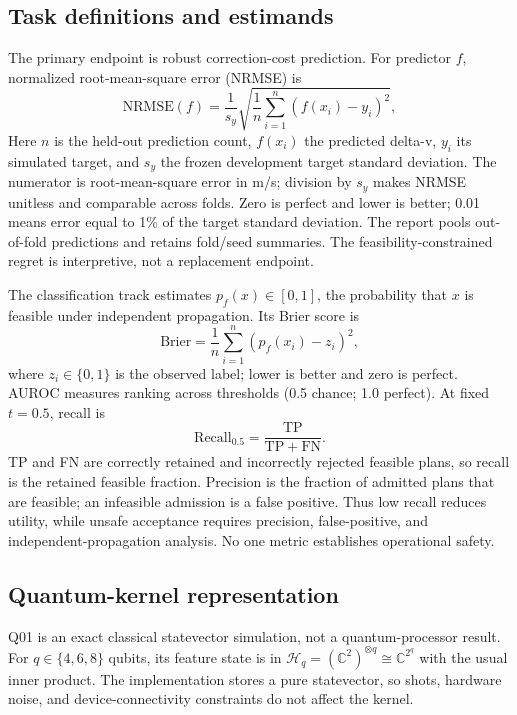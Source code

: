 \subsection{Task definitions and estimands}

The primary endpoint is robust correction-cost prediction. For predictor $f$,
normalized root-mean-square error (NRMSE) is
\begin{equation}
\mathrm{NRMSE}(f) =
\frac{1}{s_y}\sqrt{\frac{1}{n}\sum_{i=1}^{n}\left(f(x_i)-y_i\right)^2},
\label{eq:nrmse}
\end{equation}
Here $n$ is the held-out prediction count, $f(x_i)$ the predicted delta-v,
$y_i$ its simulated target, and $s_y$ the frozen development target standard
deviation. The numerator is root-mean-square error in m/s; division by $s_y$
makes NRMSE unitless and comparable across folds. Zero is perfect and lower is
better; 0.01 means error equal to 1\% of the target standard deviation. The
report pools out-of-fold predictions and retains fold/seed summaries. The
feasibility-constrained regret is interpretive, not a replacement endpoint.

The classification track estimates $p_f(x)\in[0,1]$, the probability that $x$
is feasible under independent propagation. Its Brier score is
\begin{equation}
\mathrm{Brier}=\frac{1}{n}\sum_{i=1}^{n}\left(p_f(x_i)-z_i\right)^2,
\label{eq:brier}
\end{equation}
where $z_i\in\{0,1\}$ is the observed label; lower is better and zero is
perfect. AUROC measures ranking across thresholds (0.5 chance; 1.0 perfect).
At fixed $t=0.5$, recall is
\begin{equation}
\mathrm{Recall}_{0.5}=\frac{\mathrm{TP}}{\mathrm{TP}+\mathrm{FN}}.
\label{eq:recall}
\end{equation}
TP and FN are correctly retained and incorrectly rejected feasible plans, so
recall is the retained feasible fraction. Precision is the fraction of admitted
plans that are feasible; an infeasible admission is a false positive. Thus low
recall reduces utility, while unsafe acceptance requires precision,
false-positive, and independent-propagation analysis. No one metric establishes
operational safety.

\subsection{Quantum-kernel representation}

Q01 is an exact classical statevector simulation, not a quantum-processor
result. For $q\in\{4,6,8\}$ qubits, its feature state is in
$\mathcal{H}_q=(\mathbb{C}^{2})^{\otimes q}\cong\mathbb{C}^{2^q}$ with the
usual inner product. The implementation stores a pure statevector, so shots,
hardware noise, and device-connectivity constraints do not affect the kernel.

